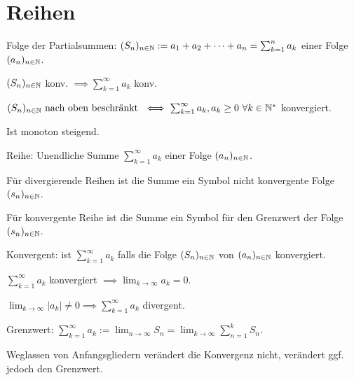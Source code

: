 \section{Reihen}
\begin{compactdesc}
    \item[Folge der Partialsummen:] $(S_n)_{n \in \mathbb{N}} := a_1 + a_2 + \dots + a_n = \sum_{k=1}^{n} a_k$ einer Folge $(a_n)_{n \in \mathbb{N}}$.
        \begin{compactitem}
        \item $(S_n)_{n \in \mathbb{N}}$ konv. $\implies \sum_{k=1}^{\infty} a_k$  konv.
            \item $(S_n)_{n \in \mathbb{N}} \text{ nach oben beschränkt } \iff \sum_{k=1}^{\infty} a_k, a_k \ge 0 \ \forall k \in \mathbb{N}^*$ konvergiert.
            \item Ist monoton steigend.
        \end{compactitem}
    \item[Reihe:] Unendliche Summe $\sum_{k=1}^{\infty} a_k$ einer Folge $(a_n)_{n \in \mathbb{N}}$.
        \begin{compactitem}
            \item Für divergierende Reihen ist die Summe ein Symbol nicht konvergente Folge $(s_n)_{n \in \mathbb{N}}$.
            \item Für konvergente Reihe ist die Summe ein Symbol für den Grenzwert der Folge $(s_n)_{n \in \mathbb{N}}$.
        \end{compactitem}
    \item[Konvergent:] ist $\sum_{k=1}^{\infty} a_k$ falls die Folge $(S_n)_{n \in \mathbb{N}}$ von $(a_n)_{n \in \mathbb{N}}$ konvergiert.
        \begin{compactitem}
            \item $\sum_{k=1}^{\infty} a_k$ konvergiert $\implies \lim_{k \to \infty} a_k = 0 $.
            \item $\lim_{k \to \infty} |a_k| \neq  0 \implies \sum_{k=1}^{\infty} a_k$ divergent.
        \end{compactitem}
    \item[Grenzwert:] $\sum_{k=1}^{\infty} a_k := \lim_{n \to \infty} S_n = \lim_{k \to \infty} \sum_{n=1}^{k} S_n$.
    \item Weglassen von Anfangsgliedern verändert die Konvergenz nicht, verändert ggf. jedoch den Grenzwert.
\end{compactdesc}

